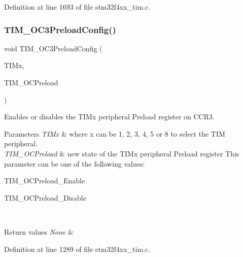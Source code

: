 Definition at line 1693 of file stm32f4xx\+\_\+tim.\+c.

\mbox{\label{group___t_i_m___group2_ga8b2391685a519e60e596b7d596f86f09}} 
\subsubsection{\texorpdfstring{T\+I\+M\+\_\+\+O\+C3\+Preload\+Config()}{TIM\_OC3PreloadConfig()}}
{\footnotesize\ttfamily void T\+I\+M\+\_\+\+O\+C3\+Preload\+Config (\begin{DoxyParamCaption}\item[{\hyperlink{struct_t_i_m___type_def}{T\+I\+M\+\_\+\+Type\+Def} $\ast$}]{T\+I\+Mx,  }\item[{uint16\+\_\+t}]{T\+I\+M\+\_\+\+O\+C\+Preload }\end{DoxyParamCaption})}



Enables or disables the T\+I\+Mx peripheral Preload register on C\+C\+R3. 


\begin{DoxyParams}{Parameters}
{\em T\+I\+Mx} & where x can be 1, 2, 3, 4, 5 or 8 to select the T\+IM peripheral. \\
\hline
{\em T\+I\+M\+\_\+\+O\+C\+Preload} & new state of the T\+I\+Mx peripheral Preload register This parameter can be one of the following values\+: \begin{DoxyItemize}
\item T\+I\+M\+\_\+\+O\+C\+Preload\+\_\+\+Enable \item T\+I\+M\+\_\+\+O\+C\+Preload\+\_\+\+Disable \end{DoxyItemize}
\\
\hline
\end{DoxyParams}

\begin{DoxyRetVals}{Return values}
{\em None} & \\
\hline
\end{DoxyRetVals}


Definition at line 1289 of file stm32f4xx\+\_\+tim.\+c.

\mbox{\label{group___t_i_m___group2_ga58279a04e8ea5333f1079d3cce8dde12}} 
